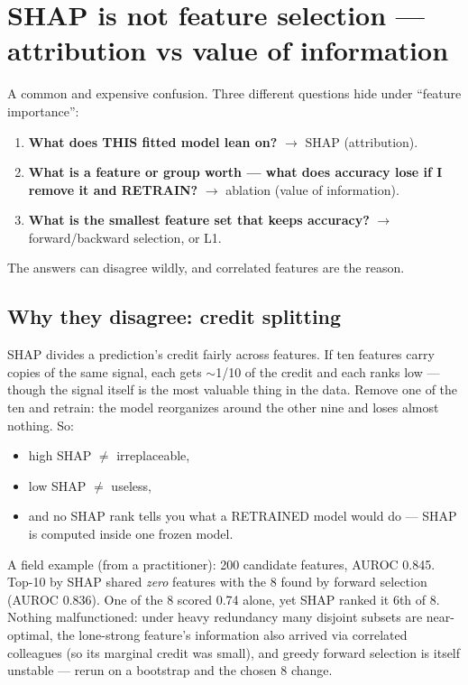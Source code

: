 \section{SHAP is not feature selection --- attribution vs value of information}

A common and expensive confusion. Three different questions hide under
``feature importance'':

\begin{enumerate}
  \item \textbf{What does THIS fitted model lean on?} $\to$ SHAP
        (attribution).
  \item \textbf{What is a feature or group worth --- what does accuracy
        lose if I remove it and RETRAIN?} $\to$ ablation
        (value of information).
  \item \textbf{What is the smallest feature set that keeps accuracy?}
        $\to$ forward/backward selection, or L1.
\end{enumerate}

The answers can disagree wildly, and correlated features are the reason.

\subsection{Why they disagree: credit splitting}

SHAP divides a prediction's credit fairly across features. If ten
features carry copies of the same signal, each gets $\sim$1/10 of the
credit and each ranks low --- though the signal itself is the most
valuable thing in the data. Remove one of the ten and retrain: the model
reorganizes around the other nine and loses almost nothing. So:

\begin{itemize}
  \item high SHAP $\neq$ irreplaceable,
  \item low SHAP $\neq$ useless,
  \item and no SHAP rank tells you what a RETRAINED model would do ---
        SHAP is computed inside one frozen model.
\end{itemize}

A field example (from a practitioner): 200 candidate features,
AUROC 0.845. Top-10 by SHAP shared \emph{zero} features with the 8
found by forward selection (AUROC 0.836). One of the 8 scored 0.74
alone, yet SHAP ranked it 6th of 8. Nothing malfunctioned: under heavy
redundancy many disjoint subsets are near-optimal, the lone-strong
feature's information also arrived via correlated colleagues (so its
marginal credit was small), and greedy forward selection is itself
unstable --- rerun on a bootstrap and the chosen 8 change.

